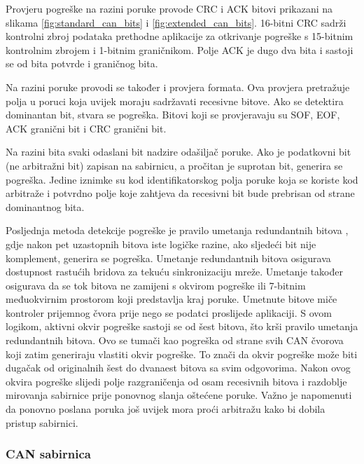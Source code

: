 Provjeru pogreške na razini poruke provode CRC i ACK bitovi prikazani na slikama \ref{fig:standard_can_bits} i \ref{fig:extended_can_bits}. 16-bitni CRC sadrži kontrolni zbroj podataka prethodne aplikacije za otkrivanje pogreške s 15-bitnim kontrolnim zbrojem i 1-bitnim graničnikom. Polje ACK je dugo dva bita i sastoji se od bita potvrde i graničnog bita.

Na razini poruke provodi se također i provjera formata. Ova provjera pretražuje polja u poruci koja uvijek moraju sadržavati recesivne bitove. Ako se detektira dominantan bit, stvara se pogreška. Bitovi koji se provjeravaju su SOF, EOF, ACK granični bit i CRC granični bit.

Na razini bita svaki odaslani bit nadzire odašiljač poruke. Ako je podatkovni bit (ne arbitražni bit) zapisan na sabirnicu, a pročitan je suprotan bit, generira se pogreška. Jedine iznimke su kod identifikatorskog polja poruke koja se koriste kod arbitraže i potvrdno polje koje zahtjeva da recesivni bit bude prebrisan od strane dominantnog bita.

Posljednja metoda detekcije pogreške je pravilo umetanja redundantnih bitova , gdje nakon pet uzastopnih bitova iste logičke razine, ako sljedeći bit nije komplement, generira se pogreška. Umetanje redundantnih bitova osigurava dostupnost rastućih bridova za tekuću sinkronizaciju mreže. Umetanje također osigurava da se tok bitova ne zamijeni s okvirom pogreške ili 7-bitnim međuokvirnim prostorom koji predstavlja kraj poruke. Umetnute bitove miče kontroler prijemnog čvora prije nego se podatci proslijede aplikaciji. S ovom logikom, aktivni okvir pogreške sastoji se od šest bitova, što krši pravilo umetanja redundantnih bitova. Ovo se tumači kao pogreška od strane svih CAN čvorova koji zatim generiraju vlastiti okvir pogreške. To znači da okvir pogreške može biti dugačak od originalnih šest do dvanaest bitova sa svim odgovorima. Nakon ovog okvira pogreške slijedi polje razgraničenja od osam recesivnih bitova i razdoblje mirovanja sabirnice prije ponovnog slanja oštećene poruke. Važno je napomenuti da ponovno poslana poruka još uvijek mora proći arbitražu kako bi dobila pristup sabirnici.

\subsubsection{CAN sabirnica}

